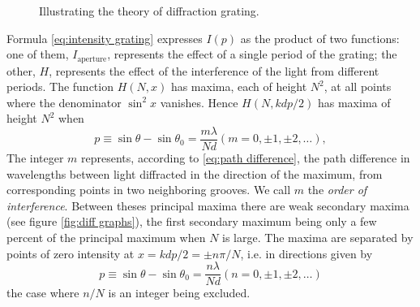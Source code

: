 \documentclass[12pt,twoside,english]{book}
\renewcommand{\~}{\perispomeni}%
\numberwithin{equation}{section}
\numberwithin{figure}{section}
\begin{document}
\begin{figure}
\begin{minipage}[t]{0.48\textwidth}

\caption{Illustrating the theory of diffraction grating.}
\label{fig:grating ray}
\end{minipage}
\hfill
\begin{minipage}[t]{0.48\textwidth}
%
\caption{}
\label{fig:aperture coord}
\end{minipage}
\end{figure}

Formula \ref{eq:intensity grating} expresses $I\left(p\right)$ as the product of two functions: one of them, $I_{\text{aperture}}$, represents the effect of a single period of the grating; the other, $H$, represents the effect of the interference of the light from different periods. The function $H\left(N,x\right)$ has maxima, each of height $N^{2}$, at all points where the denominator $\sin^2 x$ vanishes. Hence $H\left(N,kdp/2\right)$ has maxima of height $N^2$ when
\begin{equation}
p\equiv\sin\theta-\sin\theta_{0}=\frac{m\lambda}{Nd}\left(m=0,\pm1,\pm2,\ldots\right),
\label{eq:grating equation}
\end{equation}
The integer $m$ represents, according to \ref{eq:path difference}, the path difference in wavelengths between light diffracted in the direction of the maximum, from corresponding points in two neighboring grooves. We call $m$ the \emph{order of interference}. Between theses principal maxima there are weak secondary maxima (see figure \ref{fig:diff graphs}), the first secondary maximum being only a few percent of the principal maximum when $N$ is large. The maxima are separated by points of zero intensity at $x=kdp/2=\pm n\pi/N$, i.e. in directions given by\begin{equation}
p\equiv\sin\theta-\sin\theta_{0}=\frac{n\lambda}{Nd}\left(n=0,\pm1,\pm2,\ldots\right)\label{eq: grating secondary maxima}\end{equation}
the case where $n/N$ is an integer being excluded.
\end{document}
